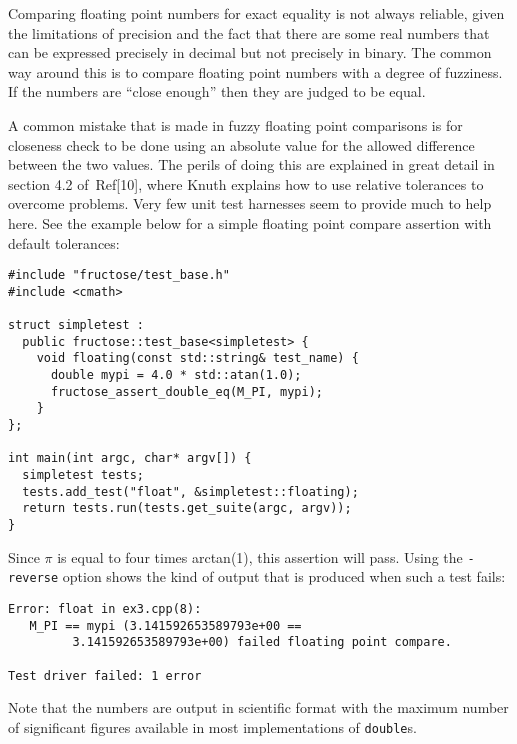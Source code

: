 \documentclass{book}
\begin{document}

Comparing floating point numbers for exact equality
is not always reliable, given the limitations of precision
and the fact that there are some real numbers that can be
expressed precisely in decimal but not precisely in binary.
The common way around this is to compare floating point
numbers with a degree of fuzziness. 
If the numbers are ``close enough''
then they are judged to be equal.

A common mistake that is made in fuzzy floating point comparisons
is for closeness check to be done using an absolute value for
the allowed difference between the two values.
The perils of doing this are explained in great detail
in section 4.2 of~Ref[10], where Knuth explains how to use relative
tolerances to overcome problems.
Very few unit test harnesses seem to provide much to help here.
See the example below for a simple floating point compare assertion
with default tolerances:

\begin{verbatim}
#include "fructose/test_base.h"
#include <cmath>

struct simpletest : 
  public fructose::test_base<simpletest> {
    void floating(const std::string& test_name) {
      double mypi = 4.0 * std::atan(1.0);
      fructose_assert_double_eq(M_PI, mypi);
    }
};

int main(int argc, char* argv[]) {
  simpletest tests;
  tests.add_test("float", &simpletest::floating);
  return tests.run(tests.get_suite(argc, argv));
}
\end{verbatim}
Since $\pi$ is equal to four times arctan(1), this assertion
will pass. Using the {\tt -reverse} option shows the kind of
output that is produced when such a test fails:

\begin{verbatim}
Error: float in ex3.cpp(8): 
   M_PI == mypi (3.141592653589793e+00 == 
         3.141592653589793e+00) failed floating point compare.

Test driver failed: 1 error
\end{verbatim}
Note that the numbers are output in scientific format with the maximum
number of significant figures available in most implementations
of {\tt double}s.

\end{document}

